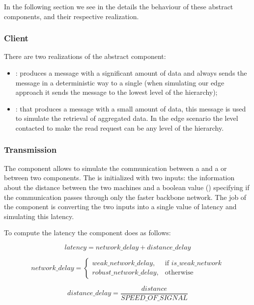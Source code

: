 In the following section we see in the details the behaviour of these abstract components, and their respective realization.


\subsubsection{Client}
There are two realizations of the  abstract component:
\begin{itemize}
    \item {}: produces a message with a significant amount of data and always sends the message in a deterministic way to a single  (when simulating our edge approach it sends the message to the lowest level of the hierarchy);
    \item {}: that produces a message with a small amount of data, this message is used to simulate the retrieval of aggregated data. In the edge scenario the level contacted to make the read request can be any level of the hierarchy.
\end{itemize}


\subsubsection{Transmission}
The  component allows to simulate the communication between a  and a  or between two  components.
The  is initialized with two inputs: the information about the distance between the two machines and a boolean value () specifying if the communication passes through only the faster backbone network. The job of the  component is converting the two inputs into a single value of latency and simulating this latency.

To compute the latency the  component does as follows:

\[ latency = network\_delay +  distance\_delay \]

\[
    network\_delay= 
\begin{cases}
    weak\_network\_delay,    & \text{if } is\_weak\_network\\
    robust\_network\_delay,  & \text{otherwise}
\end{cases}
\]

\[ distance\_delay = \frac{distance}{SPEED\_OF\_SIGNAL} \]

